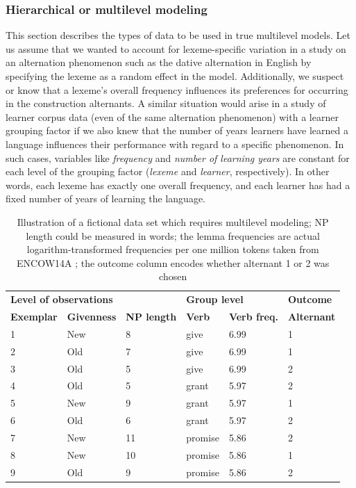 \subsubsection{Hierarchical or multilevel modeling}
\label{sec:hierarchicalormultilevelmodels}

This section describes the types of data to be used in true multilevel models.
Let us assume that we wanted to account for lexeme-specific variation in a study on an alternation phenomenon such as the dative alternation in English by specifying the lexeme as a random effect in the model.
Additionally, we suspect or know that a lexeme's overall frequency influences its preferences for occurring in the construction alternants.
A similar situation would arise in a study of learner corpus data (even of the same alternation phenomenon) with a learner grouping factor if we also knew that the number of years learners have learned a language influences their performance with regard to a specific phenomenon.
In such cases, variables like \textit{frequency} and \textit{number of learning years} are constant for each level of the grouping factor (\textit{lexeme} and \textit{learner}, respectively).
In other words, each lexeme has exactly one overall frequency, and each learner has had a fixed number of years of learning the language.

\begin{table}
  \centering
  \begin{tabular}{llllll}
    \toprule
    \multicolumn{3}{l}{\textbf{Level of observations}}          & \multicolumn{2}{l}{\textbf{Group level}}  & \textbf{Outcome} \\
    \textbf{Exemplar} & \textbf{Givenness} & \textbf{NP length} & \textbf{Verb} & \textbf{Verb freq.}       & \textbf{Alternant}\\
    \midrule
            1 &     New   &      8    &    give   &   6.99   & 1 \\
            2 &     Old   &      7    &    give   &   6.99   & 1 \\
            3 &     Old   &      5    &    give   &   6.99   & 2 \\
            4 &     Old   &      5    &    grant  &   5.97   & 2 \\
            5 &     New   &      9    &    grant  &   5.97   & 1 \\
            6 &     Old   &      6    &    grant  &   5.97   & 2 \\
            7 &     New   &      11   &   promise &   5.86   & 2 \\
            8 &     New   &      10   &   promise &   5.86   & 1 \\
            9 &     Old   &      9    &   promise &   5.86   & 2 \\
    \bottomrule
  \end{tabular}
  \caption{Illustration of a fictional data set which requires multilevel modeling; NP length could be measured in words; the lemma frequencies are actual logarithm-transformed frequencies per one million tokens taken from ENCOW14A \citep{SchaeferBildhauer2012}; the outcome column encodes whether alternant 1 or 2 was chosen}
  \label{tab:multilevel}
\end{table}

